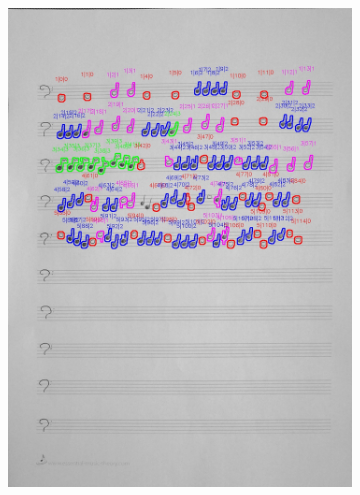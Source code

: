 \documentclass[11pt]{article}
\begin{document}
\begin{figure}[H]
    \centering
    \begin{subfigure}{.45\textwidth}
        \centering
        \graphicspath{ {blobs/} }
        \includegraphics[width=\linewidth]{6_cnts.jpg}
        \label{fig:sub1}
    \end{subfigure}%
    \begin{subfigure}{.45\textwidth}
        \centering
        \graphicspath{ {blobs/} }

\end{subfigure}
\end{figure}
\end{document}
